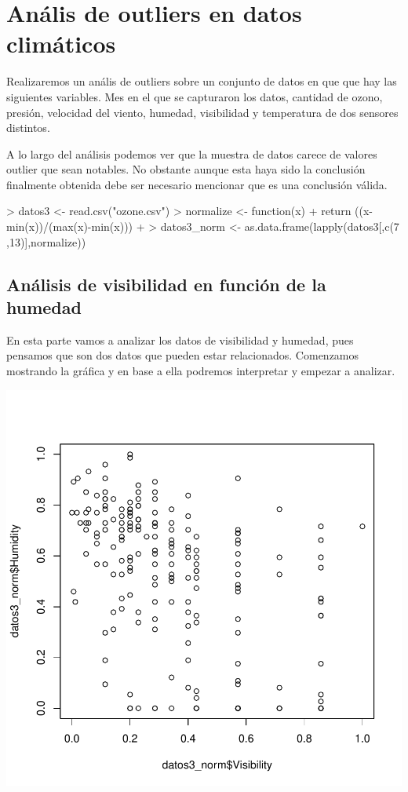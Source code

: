 \documentclass [a4paper] {article}
\begin{document}
\newpage
\section{Anális de outliers en datos climáticos}

Realizaremos un anális de outliers sobre un conjunto de datos en que que hay las siguientes variables.
Mes en el que se capturaron los datos, cantidad de ozono, presión, velocidad del viento, humedad, visibilidad y temperatura de dos sensores distintos.

A lo largo del análisis podemos ver que la muestra de datos carece de valores outlier que sean notables.
No obstante aunque esta haya sido la conclusión finalmente obtenida debe ser necesario mencionar que es una conclusión válida.

\begin{Schunk}
\begin{Sinput}
> datos3 <- read.csv("ozone.csv")
> normalize <- function(x){
+   return ((x-min(x))/(max(x)-min(x)))
+ }
> datos3_norm <-  as.data.frame(lapply(datos3[,c(7 ,13)],normalize))
\end{Sinput}
\end{Schunk}

\subsection{Análisis de visibilidad en función de la humedad}
En esta parte vamos a analizar los datos de visibilidad y humedad, pues pensamos que son dos datos que pueden estar relacionados. Comenzamos mostrando 
la gráfica y en base a ella podremos interpretar y empezar a analizar.

\begin{center}
\includegraphics{entrega-datvishum_plot}
\end{center}
\end{document}
